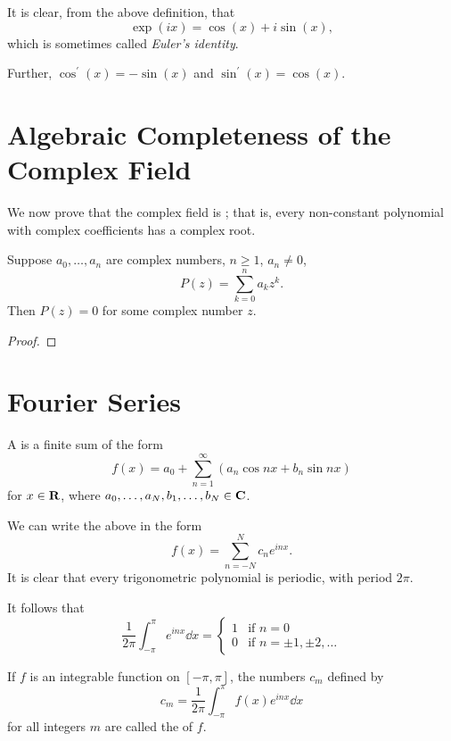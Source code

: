 It is clear, from the above definition, that
\[\exp(ix)=\cos(x)+i\sin(x),\]
which is sometimes called \emph{Euler's identity}.

Further, $\cos^\prime(x)=-\sin(x)$ and $\sin^\prime(x)=\cos(x)$.

\section{Algebraic Completeness of the Complex Field}
We now prove that the complex field is ; that is, every non-constant polynomial with complex coefficients has a complex root.

\begin{theorem}
Suppose $a_0,\dots,a_n$ are complex numbers, $n\ge1$, $a_n\neq0$,
\[P(z)=\sum_{k=0}^n a_kz^k.\]
Then $P(z)=0$ for some complex number $z$.
\end{theorem}

\begin{proof}

\end{proof}

\section{Fourier Series}
\begin{definition}
A  is a finite sum of the form
\[f(x)=a_0+\sum_{n=1}^\infty(a_n\cos nx+b_n\sin nx)\]
for $x\in\mathbf R$, where $a_0,\dots,a_N,b_1,\dots,b_N\in\mathbf C$.
\end{definition}

We can write the above in the form
\[f(x)=\sum_{n=-N}^N c_ne^{inx}.\]
It is clear that every trigonometric polynomial is periodic, with period $2\pi$.

It follows that
\[\frac{1}{2\pi}\int_{-\pi}^{\pi}e^{inx}\dd{x}=\begin{cases}
1&\text{if }n=0\\
0&\text{if }n=\pm1,\pm2,\dots
\end{cases}\]

\begin{definition}
If $f$ is an integrable function on $[-\pi,\pi]$, the numbers $c_m$ defined by
\[c_m=\frac{1}{2\pi}\int_{-\pi}^{\pi}f(x)e^{inx}\dd{x}\]
for all integers $m$ are called the  of $f$.
\end{definition}

